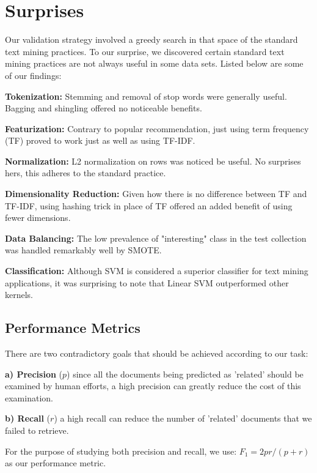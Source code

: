 \documentclass{sig-alternate-05-2015}
\newcommand{\be}{\begin{enumerate*}}
\newcommand{\ee}{\end{enumerate*}}
\begin{document}
\section{Surprises}
\label{sect:Method}
Our validation strategy involved a greedy search in that space of the standard text mining practices. To our surprise, we discovered certain standard text mining practices are not always useful in some data sets. Listed below are some of our findings:
\be
\item \textbf{Tokenization:} Stemming and removal of stop words were generally useful. Bagging and shingling offered no noticeable benefits. 
\item \textbf{Featurization:} Contrary to popular recommendation, just using term frequency (TF) proved to work just as well as using TF-IDF.
\item \textbf{Normalization:} L2 normalization on rows was noticed be useful. No surprises hers, this adheres to the standard practice.
\item \textbf{Dimensionality Reduction:} Given how there is no difference between TF and TF-IDF, using hashing trick in place of TF offered an added benefit of using fewer dimensions.
\item \textbf{Data Balancing:} The low prevalence of "interesting" class in the test collection was handled remarkably well by SMOTE.
\item \textbf{Classification:} Although SVM is considered a superior classifier for text mining applications, it was surprising to note that Linear SVM outperformed other kernels.
\ee

\subsection{Performance Metrics}


There are two contradictory goals that should be achieved according to our task: 

\textbf{a) Precision} ($p$) since all the documents being predicted as 'related' should be examined by human efforts, a high precision can greatly reduce the cost of this examination.

\textbf{b) Recall} ($r$) a high recall can reduce the number of 'related' documents that we failed to retrieve.

For the purpose of studying both precision and recall, we use:
 \mbox{$F_{1}=  2pr/(p+r)$}
as  our  performance metric.
\end{document}
